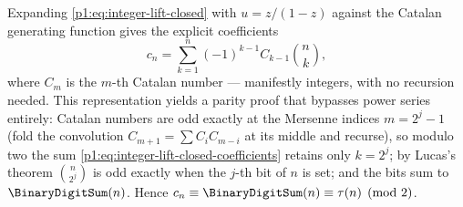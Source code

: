 \documentclass[11pt,oneside]{article}
\numberwithin{equation}{section}
\theoremstyle{definition}
\theoremstyle{remark}
\begin{document}
\begin{remark}
\label{p1:rem:integer-lift-closed-form}
Expanding \eqref{p1:eq:integer-lift-closed} with
\(u=z/(1-z)\) against the Catalan generating function gives the
explicit coefficients
\begin{equation}
  c_n=\sum_{k=1}^{n}(-1)^{k-1}C_{k-1}\binom nk,
  \label{p1:eq:integer-lift-closed-coefficients}
\end{equation}
where \(C_m\) is the \(m\)-th Catalan number --- manifestly
integers, with no recursion needed.  This representation yields a
parity proof that bypasses power series entirely: Catalan numbers are
odd exactly at the Mersenne indices \(m=2^j-1\) (fold the
convolution \(C_{m+1}=\sum C_iC_{m-i}\) at its middle and recurse),
so modulo two the sum \eqref{p1:eq:integer-lift-closed-coefficients}
retains only \(k=2^j\); by Lucas's theorem
\(\binom n{2^j}\) is odd exactly when the \(j\)-th bit of \(n\)
is set; and the bits sum to \(\BinaryDigitSum(n)\).  Hence
\(c_n\equiv \BinaryDigitSum(n)\equiv\tau(n)\pmod2\).
\end{remark}
\end{document}

